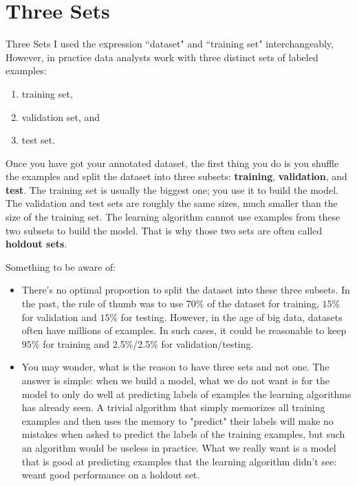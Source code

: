 \documentclass[8pt,dvipsnames]{beamer}
\begin{document}
\section{Three Sets}
\begin{frame}{Three Sets}
	I used the expression ``dataset" and ``training set" interchangeably, However, in practice data analysts work with three distinct sets of labeled examples:
	\begin{enumerate}
		\item training set,
		\item validation set, and
		\item test set.
	\end{enumerate}
	Once you have got your annotated dataset, the first thing you do is you shuffle the examples and split the dataset into three subsets: \textbf{training}, \textbf{validation}, and \textbf{test}. The training set is usually the biggest one; you use it to build the model. The validation and test sets are roughly the same sizes, much smaller than the size of the training set. The learning algorithm cannot use examples from these two subsets to build the model. That is why those two sets are often called \textbf{holdout sets}.
\end{frame}
\begin{frame}
	Something to be aware of:
	\begin{itemize}
		\item There's no optimal proportion to split the dataset into these three subsets. In the past, the rule of thumb was to use $70 \%$ of the dataset for training, $15 \%$ for validation and $15 \%$ for testing. However, in the age of big data, datasets often have millions of examples. In such cases, it could be reasonable to keep $95 \%$ for training and 2.5\%/2.5\% for validation/testing.
		\item You may wonder, what is the reason to have three sets and not one. The answer is simple: when we build a model, what we do not want is for the model to only do well at predicting labels of examples the learning algorithms has already seen. A trivial algorithm that simply memorizes all training examples and then uses the memory to "predict" their labels will make no mistakes when asked to predict the labels of the training examples, but such an algorithm would be useless in practice. What we really want is a model that is good at predicting examples that the learning algorithm didn't see: weant good performance on a holdout set.
	\end{itemize}
\end{frame}
\end{document}
